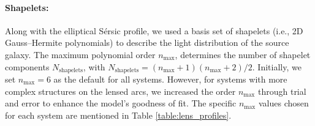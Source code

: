 \documentclass{aa}
\begin{document}
\paragraph{\textbf{Shapelets:}}%
Along with the elliptical S\'ersic profile, we used a basis set of shapelets (i.e., 2D Gauss--Hermite polynomials) to describe the light distribution of the source galaxy. The maximum polynomial order $n_\text{max}$, determines the number of shapelet components $N_\text{shapelets}$, with $N_\text{shapelets} = (n_\text{max} + 1)(n_\text{max}+2)/2$. Initially, we set $n_\text{max} = 6$ as the default for all systems. However, for systems with more complex structures on the lensed arcs, we increased the order $n_\text{max}$ through trial and error to enhance the model’s goodness of fit. The specific $n_\text{max}$ values chosen for each system are mentioned in Table \ref{table:lens_profiles}.

\end{document}
